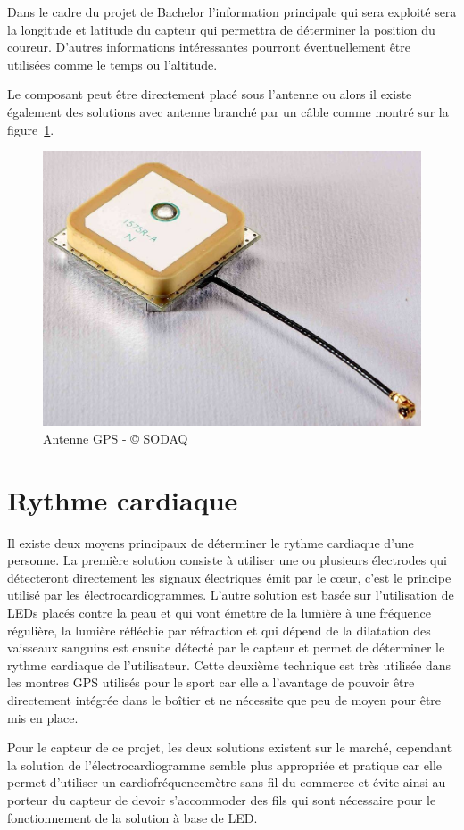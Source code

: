 Dans le cadre du projet de Bachelor l’information principale qui sera exploité sera la longitude et latitude du capteur qui permettra de déterminer la position du coureur. D’autres informations intéressantes pourront éventuellement être utilisées comme le temps ou l’altitude.

Le composant peut être directement placé sous l’antenne ou alors il existe également des solutions avec antenne branché par un câble comme montré sur la figure~\ref{fig:antenne_gps}.

\begin{figure}[htb]
\centering 
\includegraphics[width=0.6\columnwidth]{../images/active-gps-antenna-large.jpg} 
\caption[Antenne GPS]{Antenne GPS - © SODAQ}
\label{fig:antenne_gps}
\end{figure}

\section{Rythme cardiaque}

Il existe deux moyens principaux de déterminer le rythme cardiaque d’une personne. La première solution consiste à utiliser une ou plusieurs électrodes qui détecteront directement les signaux électriques émit par le cœur, c’est le principe utilisé par les électrocardiogrammes. L’autre solution est basée sur l’utilisation de LEDs placés contre la peau et qui vont émettre de la lumière à une fréquence régulière, la lumière réfléchie par réfraction et qui dépend de la dilatation des vaisseaux sanguins est ensuite détecté par le capteur et permet de déterminer le rythme cardiaque de l’utilisateur. Cette deuxième technique est très utilisée dans les montres GPS utilisés pour le sport car elle a l’avantage de pouvoir être directement intégrée dans le boîtier et ne nécessite que peu de moyen pour être mis en place.

Pour le capteur de ce projet, les deux solutions existent sur le marché, cependant la solution de l’électrocardiogramme semble plus appropriée et pratique car elle permet d’utiliser un cardiofréquencemètre sans fil du commerce et évite ainsi au porteur du capteur de devoir s’accommoder des fils qui sont nécessaire pour le fonctionnement de la solution à base de LED.


